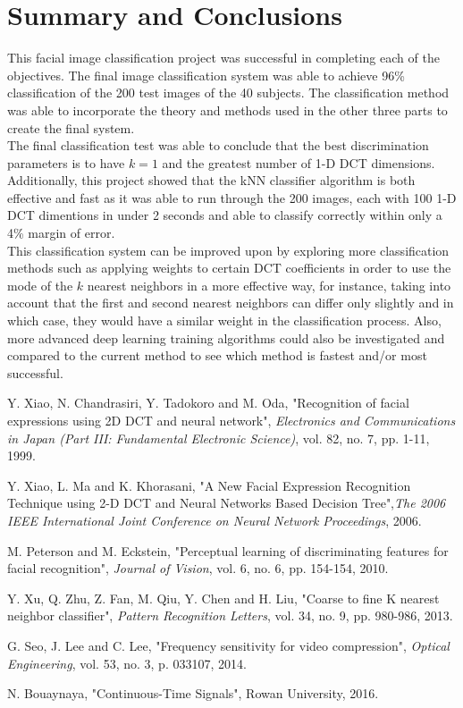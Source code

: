 \documentclass[conference]{IEEEtran}
\begin{document}
\section{Summary and Conclusions}
This facial image classification project was successful in completing each of
the objectives. The final image classification system was able to achieve 96\%
classification of the 200 test images of the 40 subjects. The classification
method was able to incorporate the theory and methods used in the other three
parts to create the final system.
\\
The final classification test was able to conclude that the best discrimination
parameters is to have $k=1$ and the greatest number of 1-D DCT dimensions.
Additionally, this project showed that the kNN classifier algorithm is both
effective and fast as it was able to run through the 200 images, each with 100
1-D DCT dimentions in under 2 seconds and able to classify correctly within only
a 4\% margin of error.
\\
This classification system can be improved upon by exploring more classification
methods such as applying weights to certain DCT coefficients in order to use the
mode of the $k$ nearest neighbors in a more effective way, for instance, taking
into account that the first and second nearest neighbors can differ only
slightly and in which case, they would have a similar weight in the
classification process. Also, more advanced deep learning training
algorithms could also be investigated and compared to the current method to see
which method is fastest and/or most successful.

\begin{thebibliography}{99}

    Y. Xiao, N. Chandrasiri, Y. Tadokoro and M. Oda, "Recognition of facial
    expressions using 2D DCT and neural network", \textit{Electronics and
      Communications in Japan (Part III: Fundamental Electronic Science)}, vol. 82, no. 7, pp. 1-11, 1999.

    Y. Xiao, L. Ma and K. Khorasani, "A New Facial Expression Recognition
    Technique using 2-D DCT and Neural Networks Based Decision Tree",\textit{The
      2006 IEEE International Joint Conference on Neural Network Proceedings}, 2006.

    M. Peterson and M. Eckstein, "Perceptual learning of discriminating
    features for facial recognition", \textit{Journal of Vision}, vol. 6, no. 6, pp.
    154-154, 2010.

    Y. Xu, Q. Zhu, Z. Fan, M. Qiu, Y. Chen and H. Liu, "Coarse to fine K nearest
    neighbor classifier", \textit{Pattern Recognition Letters}, vol. 34, no. 9, pp.
    980-986, 2013.

    G. Seo, J. Lee and C. Lee, "Frequency sensitivity for video compression",
    \textit{Optical Engineering}, vol. 53, no. 3, p. 033107, 2014.

    N. Bouaynaya, "Continuous-Time Signals", Rowan University, 2016.


\end{thebibliography}
\end{document}
